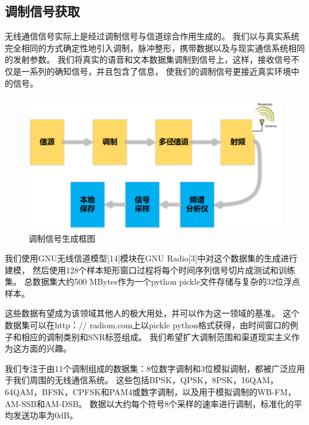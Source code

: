 \subsection{调制信号获取}

无线通信信号实际上是经过调制信号与信道综合作用生成的。
我们以与真实系统完全相同的方式确定性地引入调制，脉冲整形，携带数据以及与现实通信系统相同的发射参数。 
我们将真实的语音和文本数据集调制到信号上，这样，接收信号不仅是一系列的确知信号，并且包含了信息，
使我们的调制信号更接近真实环境中的信号。\par

\begin{figure}
	\centering
	\includegraphics[scale=0.6]{./figures/chapter_3/fig_3_1}
	\caption{调制信号生成框图}\label{sec:fig_3_1}
\end{figure}

我们使用GNU无线信道模型[14]模块在GNU Radio[3]中对这个数据集的生成进行建模，
然后使用128个样本矩形窗口过程将每个时间序列信号切片成测试和训练集。 
总数据集大约500 MBytes作为一个python pickle文件存储与复杂的32位浮点样本。\par

这些数据有望成为该领域其他人的极大用处，并可以作为这一领域的基准。 这个数据集可以在http：// radiom.com上以pickle python格式获得，由时间窗口的例子和相应的调制类别和SNR标签组成。 我们希望扩大调制范围和渠道现实主义作为这方面的兴趣。\par

我们专注于由11个调制组成的数据集：8位数字调制和3位模拟调制，都被广泛应用于我们周围的无线通信系统。 这些包括BPSK，QPSK，8PSK，16QAM，64QAM，BFSK，CPFSK和PAM4或数字调制，以及用于模拟调制的WB-FM，AM-SSB和AM-DSB。 数据以大约每个符号8个采样的速率进行调制，标准化的平均发送功率为0dB。\par

